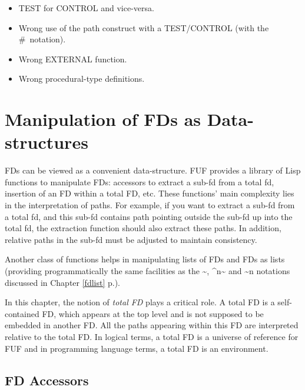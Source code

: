 \documentclass[10pt,a4paper]{report}
\begin{document}
\begin{itemize}
\begin{itemize}
\item TEST for CONTROL and vice-versa.

\item Wrong use of the path construct with a TEST/CONTROL (with the \#\ notation).

\item Wrong EXTERNAL function.

\item Wrong procedural-type definitions.
\end{itemize}
\end{itemize}


\chapter{Manipulation of FDs as Data-structures}

FDs can be viewed as a convenient data-structure.  FUF provides a library
of Lisp functions to manipulate FDs: accessors to extract a sub-fd from a
total fd, insertion of an FD within a total FD, etc.  These functions' main
complexity lies in the interpretation of paths.  For example, if you want
to extract a sub-fd from a total fd, and this sub-fd contains path pointing
outside the sub-fd up into the total fd, the extraction function should
also extract these paths.  In addition, relative paths in the sub-fd must
be adjusted to maintain consistency.  

Another class of functions helps in manipulating lists of FDs and FDs as
lists (providing programmatically the same facilities as the \~{}, \^{}n\~{} and \~{}n
notations discussed in Chapter \ref{fdlist} p.\pageref{fdlist}).


In this chapter, the notion of {\em total FD} plays a critical role.  A total
FD is a self-contained FD, which appears at the top level and is not
supposed to be embedded in another FD.  All the paths appearing within this
FD are interpreted relative to the total FD.  In logical terms, a total FD
is a universe of reference for FUF and in programming language terms, a
total FD is an environment.


\section{FD Accessors}
\end{document}
